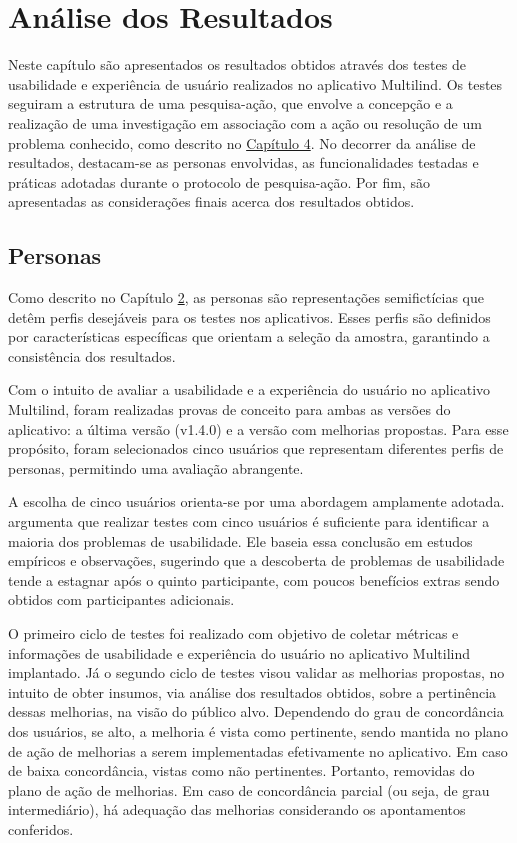 \chapter[Análise dos Resultados]{Análise dos Resultados}
\label{chap:Status}
Neste capítulo são apresentados os resultados obtidos através dos testes de usabilidade e experiência de usuário realizados no aplicativo Multilind. Os testes seguiram a estrutura de uma pesquisa-ação, que envolve a concepção e a realização de uma 
investigação em associação com a ação ou resolução de um problema conhecido, como descrito no \hyperref[sec:Metodologia de Analise de Resultados]{Capítulo 4}. No decorrer da análise de resultados, destacam-se as personas envolvidas, as funcionalidades 
testadas e práticas adotadas durante o protocolo de pesquisa-ação. Por fim, são apresentadas as considerações finais acerca dos resultados obtidos.

\section{Personas}
\label{sec:Personas}
Como descrito no Capítulo \hyperref[sec:Persona]{2}, as personas são representações semifictícias que detêm perfis desejáveis para os testes nos aplicativos. Esses perfis são definidos por características específicas que orientam a seleção da amostra, 
garantindo a consistência dos resultados. 

Com o intuito de avaliar a usabilidade e a experiência do usuário no aplicativo Multilind, foram realizadas provas de conceito para ambas as versões do aplicativo: a última versão (v1.4.0) e a versão com melhorias propostas. Para esse propósito, 
foram selecionados cinco usuários que representam diferentes perfis de personas, permitindo uma avaliação abrangente.

A escolha de cinco usuários orienta-se por uma abordagem amplamente adotada.  argumenta que realizar testes com cinco usuários é suficiente para identificar a maioria dos problemas de 
usabilidade. Ele baseia essa conclusão em estudos empíricos e observações, sugerindo que a descoberta de problemas de usabilidade tende a estagnar após o quinto participante, com poucos benefícios 
extras sendo obtidos com participantes adicionais.

O primeiro ciclo de testes foi realizado com objetivo de coletar métricas e informações de usabilidade e experiência do usuário no aplicativo Multilind implantado. Já o segundo ciclo de testes visou validar as 
melhorias propostas, no intuito de obter insumos, via análise dos resultados obtidos, sobre a pertinência dessas melhorias, na visão do público alvo. Dependendo do grau de concordância dos usuários, se alto, a 
melhoria é vista como pertinente, sendo mantida no plano de ação de melhorias a serem implementadas efetivamente no aplicativo. Em caso de baixa concordância, vistas como não pertinentes. Portanto, removidas 
do plano de ação de melhorias. Em caso de concordância parcial (ou seja, de grau intermediário), há adequação das melhorias considerando os apontamentos conferidos. 

